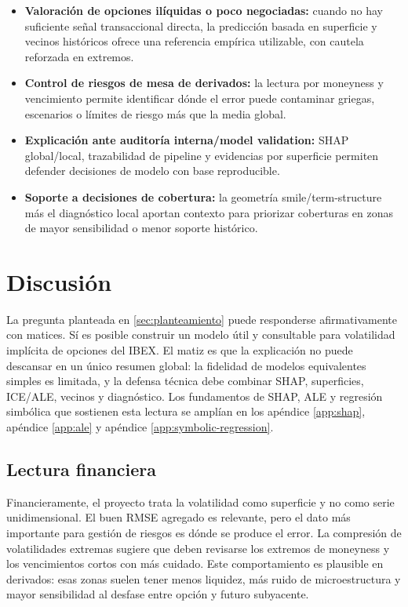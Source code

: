 \begin{itemize}
  \item \textbf{Valoración de opciones ilíquidas o poco negociadas:} cuando no hay suficiente señal transaccional directa, la predicción basada en superficie y vecinos históricos ofrece una referencia empírica utilizable, con cautela reforzada en extremos.
  \item \textbf{Control de riesgos de mesa de derivados:} la lectura por moneyness y vencimiento permite identificar dónde el error puede contaminar griegas, escenarios o límites de riesgo más que la media global.
  \item \textbf{Explicación ante auditoría interna/model validation:} SHAP global/local, trazabilidad de pipeline y evidencias por superficie permiten defender decisiones de modelo con base reproducible.
  \item \textbf{Soporte a decisiones de cobertura:} la geometría smile/term-structure más el diagnóstico local aportan contexto para priorizar coberturas en zonas de mayor sensibilidad o menor soporte histórico.
\end{itemize}


\section{Discusión}
\label{sec:discusion}

La pregunta planteada en \autoref{sec:planteamiento} puede responderse afirmativamente con matices. Sí es posible construir un modelo útil y consultable para volatilidad implícita de opciones del IBEX. El matiz es que la explicación no puede descansar en un único resumen global: la fidelidad de modelos equivalentes simples es limitada, y la defensa técnica debe combinar SHAP, superficies, ICE/ALE, vecinos y diagnóstico. Los fundamentos de SHAP, ALE y regresión simbólica que sostienen esta lectura se amplían en los apéndice \ref{app:shap}, apéndice \ref{app:ale} y apéndice \ref{app:symbolic-regression}.

\subsection{Lectura financiera}
\label{subsec:discusion-financiera}

Financieramente, el proyecto trata la volatilidad como superficie y no como serie unidimensional. El buen RMSE agregado es relevante, pero el dato más importante para gestión de riesgos es dónde se produce el error. La compresión de volatilidades extremas sugiere que deben revisarse los extremos de moneyness y los vencimientos cortos con más cuidado. Este comportamiento es plausible en derivados: esas zonas suelen tener menos liquidez, más ruido de microestructura y mayor sensibilidad al desfase entre opción y futuro subyacente.

